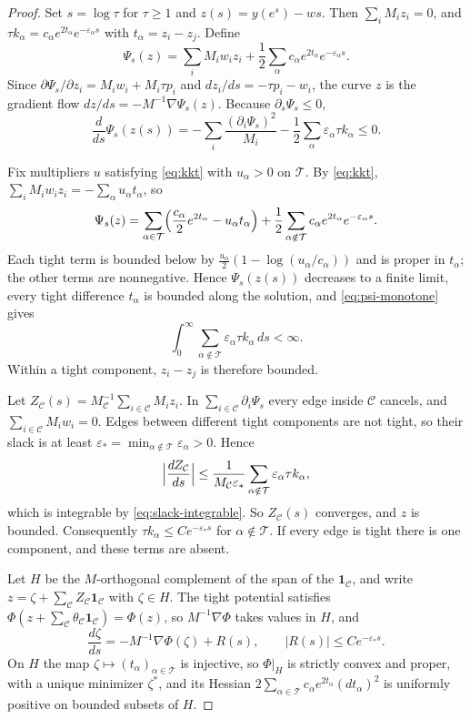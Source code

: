 \begin{proof}
Set $s=\log\tau$ for $\tau\ge1$ and $z(s)=y(e^s)-ws$. Then
$\sum_iM_iz_i=0$, and $\tau k_\alpha=c_\alpha e^{2t_\alpha}e^{-\varepsilon_\alpha s}$
with $t_\alpha=z_i-z_j$. Define
\[
 \Psi_s(z)=\sum_iM_iw_iz_i
 +\frac12\sum_\alpha c_\alpha e^{2t_\alpha}e^{-\varepsilon_\alpha s}.
\]
Since $\partial\Psi_s/\partial z_i=M_iw_i+M_i\tau p_i$ and
$dz_i/ds=-\tau p_i-w_i$, the curve $z$ is the gradient flow
$dz/ds=-M^{-1}\nabla\Psi_s(z)$. Because $\partial_s\Psi_s\le0$,
\begin{equation}\label{eq:psi-monotone}
 \frac{d}{ds}\Psi_s(z(s))
 =-\sum_i\frac{(\partial_i\Psi_s)^2}{M_i}
  -\frac12\sum_\alpha\varepsilon_\alpha\tau k_\alpha\le0.
\end{equation}

Fix multipliers $u$ satisfying \eqref{eq:kkt} with $u_\alpha>0$ on $\mathcal T$.
By \eqref{eq:kkt}, $\sum_iM_iw_iz_i=-\sum_\alpha u_\alpha t_\alpha$, so
\[
 \Psi_s(z)=\sum_{\alpha\in\mathcal T}\Bigl(\frac{c_\alpha}2e^{2t_\alpha}
 -u_\alpha t_\alpha\Bigr)
 +\frac12\sum_{\alpha\notin\mathcal T}c_\alpha e^{2t_\alpha}e^{-\varepsilon_\alpha s}.
\]
Each tight term is bounded below by $\frac{u_\alpha}2(1-\log(u_\alpha/c_\alpha))$
and is proper in $t_\alpha$; the other terms are nonnegative. Hence
$\Psi_s(z(s))$ decreases to a finite limit, every tight difference
$t_\alpha$ is bounded along the solution, and \eqref{eq:psi-monotone} gives
\begin{equation}\label{eq:slack-integrable}
 \int_0^\infty\sum_{\alpha\notin\mathcal T}\varepsilon_\alpha\tau k_\alpha\,ds<\infty.
\end{equation}
Within a tight component, $z_i-z_j$ is therefore bounded.

Let $Z_{\mathcal C}(s)=M_{\mathcal C}^{-1}\sum_{i\in\mathcal C}M_iz_i$. In
$\sum_{i\in\mathcal C}\partial_i\Psi_s$ every edge inside $\mathcal C$ cancels, and
$\sum_{i\in\mathcal C}M_iw_i=0$. Edges between different tight components are not
tight, so their slack is at least
$\varepsilon_*=\min_{\alpha\notin\mathcal T}\varepsilon_\alpha>0$. Hence
\[
 \Bigl|\frac{dZ_{\mathcal C}}{ds}\Bigr|
 \le\frac1{M_{\mathcal C}\varepsilon_*}\sum_{\alpha\notin\mathcal T}\varepsilon_\alpha\tau k_\alpha,
\]
which is integrable by \eqref{eq:slack-integrable}. So $Z_{\mathcal C}(s)$ converges,
and $z$ is bounded. Consequently $\tau k_\alpha\le Ce^{-\varepsilon_*s}$ for
$\alpha\notin\mathcal T$. If every edge is tight there is one component, and these
terms are absent.

Let $H$ be the $M$-orthogonal complement of the span of the $\mathbf 1_{\mathcal C}$,
and write $z=\zeta+\sum_{\mathcal C}Z_{\mathcal C}\mathbf 1_{\mathcal C}$ with $\zeta\in H$. The tight
potential satisfies $\Phi(z+\sum_{\mathcal C}\theta_{\mathcal C}\mathbf 1_{\mathcal C})=\Phi(z)$, so
$M^{-1}\nabla\Phi$ takes values in $H$, and
\[
 \frac{d\zeta}{ds}=-M^{-1}\nabla\Phi(\zeta)+R(s),\qquad
 |R(s)|\le Ce^{-\varepsilon_*s}.
\]
On $H$ the map $\zeta\mapsto(t_\alpha)_{\alpha\in\mathcal T}$ is injective, so
$\Phi|_H$ is strictly convex and proper, with a unique minimizer $\zeta^*$,
and its Hessian $2\sum_{\alpha\in\mathcal T}c_\alpha e^{2t_\alpha}(dt_\alpha)^2$ is
uniformly positive on bounded subsets of $H$.


\end{proof}

